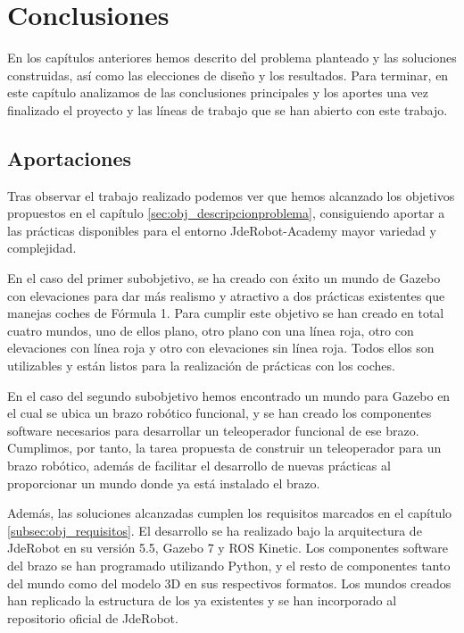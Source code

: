 \chapter{Conclusiones}
\label{ch:Conclusiones}

En los capítulos anteriores hemos descrito del problema planteado y las soluciones construidas, así como las elecciones de diseño y los resultados. Para terminar, en este capítulo analizamos de las conclusiones principales y los aportes una vez finalizado el proyecto y las líneas de trabajo que se han abierto con este trabajo.

\section{Aportaciones}
\label{sec:cn_aportaciones}

Tras observar el trabajo realizado podemos ver que hemos alcanzado los objetivos propuestos en el capítulo \ref{sec:obj_descripcionproblema}, consiguiendo aportar a las prácticas disponibles para el entorno JdeRobot-Academy mayor variedad y complejidad.

En el caso del primer subobjetivo, se ha creado con éxito un mundo de Gazebo con elevaciones para dar más realismo y atractivo a dos prácticas existentes que manejas coches de Fórmula 1. Para cumplir este objetivo se han creado en total cuatro mundos, uno de ellos plano, otro plano con una línea roja, otro con elevaciones con línea roja y otro con elevaciones sin línea roja. Todos ellos son utilizables y están listos para la realización de prácticas con los coches.

En el caso del segundo subobjetivo hemos encontrado un mundo para Gazebo en el cual se ubica un brazo robótico funcional, y se han creado los componentes software necesarios para desarrollar un teleoperador funcional de ese brazo. Cumplimos, por tanto, la tarea propuesta de construir un teleoperador para un brazo robótico, además de facilitar el desarrollo de nuevas prácticas al proporcionar un mundo donde ya está instalado el brazo.

Además, las soluciones alcanzadas cumplen los requisitos marcados en el capítulo \ref{subsec:obj_requisitos}. El desarrollo se ha realizado bajo la arquitectura de JdeRobot en su versión 5.5, Gazebo 7 y ROS Kinetic. Los componentes software del brazo se han programado utilizando Python, y el resto de componentes tanto del mundo como del modelo 3D en sus respectivos formatos. Los mundos creados han replicado la estructura de los ya existentes y se han incorporado al repositorio oficial de JdeRobot.

